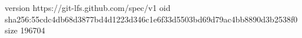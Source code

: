 version https://git-lfs.github.com/spec/v1
oid sha256:55cdc4db68d3877bd4d1223d346c1e6f33d5503bd69d79ac4bb8890d3b2538f0
size 196704
